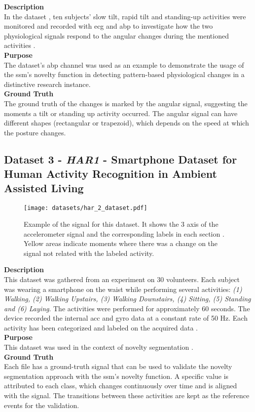 \textbf{Description}\hfill\\
In the dataset \cite{tilt}, ten subjects' slow tilt, rapid tilt and standing-up activities were monitored and recorded with \gls{ecg} and \gls{abp} to investigate how the two physiological signals respond to the angular changes during the mentioned activities \cite{tilt, PhysioNet}.\\
\textbf{Purpose}\hfill\\
The dataset's \gls{abp} channel was used as an example to demonstrate the usage of the \gls{ssm}'s novelty function in detecting pattern-based physiological changes in a distinctive research instance.\\
\textbf{Ground Truth}\hfill\\
The ground truth of the changes is marked by the angular signal, suggesting the moments a tilt or standing up activity occurred. The angular signal can have different shapes (rectangular or trapezoid), which depends on the speed at which the posture changes.
 
\subsection{Dataset 3 - \textit{HAR1} - Smartphone Dataset for Human Activity Recognition in Ambient Assisted Living}
\label{dat:dataset3}

\begin{figure}
\centering
\texttt{[image: datasets/har\_2\_dataset.pdf]}
\caption{Example of the signal for this dataset. It shows the 3 axis of the accelerometer signal and the corresponding labels in each section \cite{dataset2, dataset2_2}. Yellow areas indicate moments where there was a change on the signal not related with the labeled activity.}
\label{fig:har2_dataset}
\end{figure}

\textbf{Description}\hfill\\
This dataset was gathered from an experiment on 30 volunteers. Each subject was wearing a smartphone on the waist while performing several activities: \textit{(1) Walking, (2) Walking Upstairs, (3) Walking Downstairs, (4) Sitting, (5) Standing and (6) Laying}. The activities were performed for approximately 60 seconds. The device recorded the internal \gls{acc} and \gls{gyro} data at a constant rate of 50 Hz. Each activity has been categorized and labeled on the acquired data \cite{dataset2, dataset2_2}.\\
\textbf{Purpose}\hfill\\
This dataset was used in the context of novelty segmentation \cite{dataset2, dataset2_2}.\\
\textbf{Ground Truth}\hfill\\
Each file has a ground-truth signal that can be used to validate the novelty segmentation approach with the \gls{ssm}'s novelty function. A specific value is attributed to each class, which changes continuously over time and is aligned with the signal. The transitions between these activities are kept as the reference events for the validation.
    
